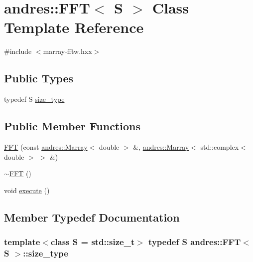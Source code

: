 \hypertarget{classandres_1_1FFT}{}\section{andres\+:\+:F\+F\+T$<$ S $>$ Class Template Reference}
\label{classandres_1_1FFT}


{\ttfamily \#include $<$marray-\/fftw.\+hxx$>$}

\subsection*{Public Types}
\begin{DoxyCompactItemize}
\item 
typedef S \hyperlink{classandres_1_1FFT_a22b9513914905e90538e45d02c5e3601}{size\+\_\+type}
\end{DoxyCompactItemize}
\subsection*{Public Member Functions}
\begin{DoxyCompactItemize}
\item 
\hyperlink{classandres_1_1FFT_a0163fa67e3b12c454ebfd688e54f7859}{F\+F\+T} (const \hyperlink{classandres_1_1Marray}{andres\+::\+Marray}$<$ double $>$ \&, \hyperlink{classandres_1_1Marray}{andres\+::\+Marray}$<$ std\+::complex$<$ double $>$ $>$ \&)
\item 
\hyperlink{classandres_1_1FFT_a11656c721a5b073be01fbdd71793ee1e}{$\sim$\+F\+F\+T} ()
\item 
void \hyperlink{classandres_1_1FFT_aa73174ae3df430476d768eab0ad0e283}{execute} ()
\end{DoxyCompactItemize}


\subsection{Member Typedef Documentation}
\hypertarget{classandres_1_1FFT_a22b9513914905e90538e45d02c5e3601}{}
\subsubsection[{size\+\_\+type}]{\setlength{\rightskip}{0pt plus 5cm}template$<$class S  = std\+::size\+\_\+t$>$ typedef S {\bf andres\+::\+F\+F\+T}$<$ S $>$\+::{\bf size\+\_\+type}}\label{classandres_1_1FFT_a22b9513914905e90538e45d02c5e3601}


